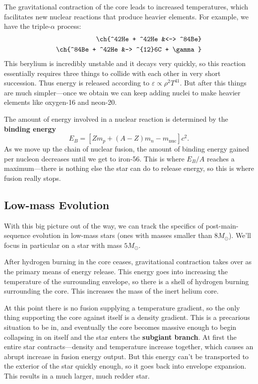 \documentclass[../a062main.tex]{subfiles}
\begin{document}
The gravitational contraction of the core leads to increased temperatures, which facilitates new nuclear reactions that produce heavier elements.
For example, we have the triple-$\alpha$ process:
\begin{align*}
    \ch{^42He + ^42He &<-> ^84Be} \\
    \ch{^84Be + ^42He &-> ^{12}6C + \gamma}
\end{align*}
This berylium is incredibly unstable and it decays very quickly, so this reaction essentially requires three things to collide with each other in very short succession.
Thus energy is released according to $\varepsilon \propto \rho^2 T^{41}$.
But after this things are much simpler---once we obtain  we can keep adding  nuclei to make heavier elements like oxygen-16 and neon-20.

The amount of energy involved in a nuclear reaction is determined by the \textbf{binding energy}
\[ E_B = [Zm_p + (A - Z)m_n - m_\text{nuc}]c^2. \]
As we move up the chain of nuclear fusion, the amount of binding energy gained per nucleon decreases until we get to iron-56.
This is where $E_B / A$ reaches a maximum---there is nothing else the star can do to release energy, so this is where fusion really stops.

\subsection*{Low-mass Evolution}
With this big picture out of the way, we can track the specifics of post-main-sequence evolution in low-mass stars (ones with masses smaller than $8M_\odot$).
We'll focus in particular on a star with mass $5M_\odot$.

After hydrogen burning in the core ceases, gravitational contraction takes over as the primary means of energy release.
This energy goes into increasing the temperature of the surrounding envelope, so there is a shell of hydrogen burning surrounding the core.
This increases the mass of the inert helium core.

At this point there is no fusion supplying a temperature gradient, so the only thing supporting the core against itself is a density gradient.
This is a precarious situation to be in, and eventually the core becomes massive enough to begin collapsing in on itself and the star enters the \textbf{subgiant branch}.
At first the entire star contracts---density and temperature increase together, which causes an abrupt increase in fusion energy output.
But this energy can't be transported to the exterior of the star quickly enough, so it goes back into envelope expansion.
This results in a much larger, much redder star.
\end{document}
